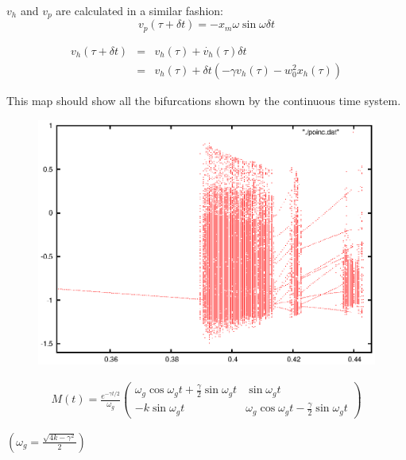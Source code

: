 \documentclass[xcolor=x11names,compress]{beamer}
\renewcommand{\(}{\begin{columns}}
\renewcommand{\)}{\end{columns}}
\newcommand{\<}[1]{\begin{column}{#1}}
\renewcommand{\>}{\end{column}}
\begin{document}
\begin{frame}
$v_h$ and $v_p$ are calculated in a similar fashion:
\[
v_p(\tau+\delta t)=-x_m\omega\sin{\omega\delta t}
\]

\begin{eqnarray*}
v_h(\tau+\delta t)&=&v_h(\tau)+\dot{v_h}(\tau)\delta t\\
&=&v_h(\tau)+\delta t(-\gamma v_h(\tau)-w_0^2x_h(\tau))
\end{eqnarray*}

This map should show all the bifurcations shown by the continuous time system.  
\end{frame}


\begin{frame}
\begin{figure}
\caption{}
\begin{center}
\includegraphics[width=0.9\columnwidth]{poinc-bf-f}
\end{center}
\end{figure}
\end{frame}

\begin{frame}[label=homogen-evol]
\begin{eqnarray}
M(t)=\frac{e^{-\gamma t/2}}{\omega_g}
\begin{pmatrix}
\omega_g\cos{\omega_g t}+\frac{\gamma}{2}\sin{\omega_g t} & \sin{\omega_g t}\\
-k\sin{\omega_g t} & \omega_g\cos{\omega_g t}-\frac{\gamma}{2}\sin{\omega_g t}
\end{pmatrix}
\end{eqnarray}

$(\omega_g=\frac{\sqrt{4k-\gamma^2}}{2})$
\hyperlink{BackFromM}{}
\end{frame}
\end{document}
